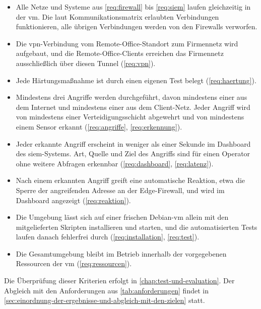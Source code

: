 \begin{itemize}
	\item Alle Netze und Systeme aus \ref{req:firewall} bis \ref{req:siem} laufen gleichzeitig in der \acs{vm}. Die laut Kommunikationsmatrix erlaubten Verbindungen funktionieren, alle übrigen Verbindungen werden von den Firewalls verworfen.
	\item Die \acs{vpn}-Verbindung vom Remote-Office-Standort zum Firmennetz wird aufgebaut, und die Remote-Office-Clients erreichen das Firmennetz ausschließlich über diesen Tunnel (\ref{req:vpn}).
	\item Jede Härtungsmaßnahme ist durch einen eigenen Test belegt (\ref{req:haertung}).
	\item Mindestens drei Angriffe werden durchgeführt, davon mindestens einer aus dem Internet und mindestens einer aus dem Client-Netz. Jeder Angriff wird von mindestens einer Verteidigungsschicht abgewehrt und von mindestens einem Sensor erkannt (\ref{req:angriffe}, \ref{req:erkennung}).
	\item Jeder erkannte Angriff erscheint in weniger als einer Sekunde im Dashboard des \acs{siem}-Systems. Art, Quelle und Ziel des Angriffs sind für einen Operator ohne weitere Abfragen erkennbar (\ref{req:dashboard}, \ref{req:latenz}).
	\item Nach einem erkannten Angriff greift eine automatische Reaktion, etwa die Sperre der angreifenden Adresse an der Edge-Firewall, und wird im Dashboard angezeigt (\ref{req:reaktion}).
	\item Die Umgebung lässt sich auf einer frischen Debian-\acs{vm} allein mit den mitgelieferten Skripten installieren und starten, und die automatisierten Tests laufen danach fehlerfrei durch (\ref{req:installation}, \ref{req:test}).
	\item Die Gesamtumgebung bleibt im Betrieb innerhalb der vorgegebenen Ressourcen der \acs{vm} (\ref{req:ressourcen}).
\end{itemize}

Die Überprüfung dieser Kriterien erfolgt in \autoref{chap:test-und-evaluation}. Der Abgleich mit den Anforderungen aus \autoref{tab:anforderungen} findet in \autoref{sec:einordnung-der-ergebnisse-und-abgleich-mit-den-zielen} statt.
